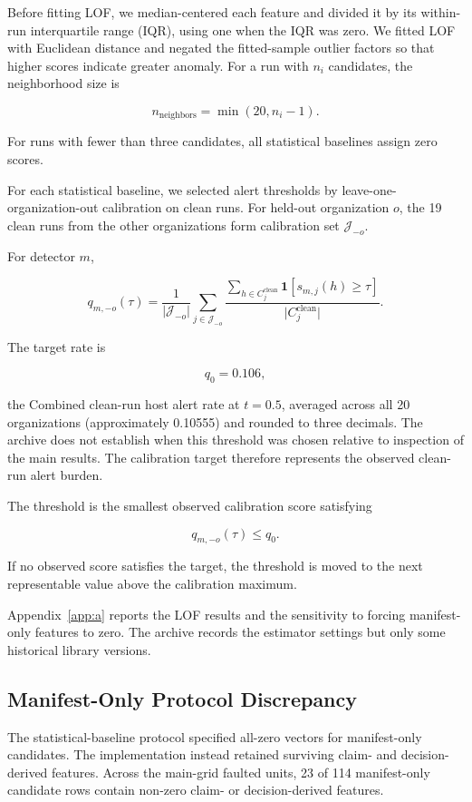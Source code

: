 \documentclass[sn-basic]{sn-jnl}%
\theoremstyle{thmstyleone}%
\theoremstyle{thmstyletwo}%
\theoremstyle{thmstylethree}%
\begin{document}
Before fitting LOF, we median-centered each feature and divided it by its within-run interquartile range (IQR), using one when the IQR was zero. We fitted LOF with Euclidean distance and negated the fitted-sample outlier factors so that higher scores indicate greater anomaly. For a run with \(n_i\) candidates, the neighborhood size is

\[
n_{\mathrm{neighbors}}=\min(20,n_i-1).
\]

For runs with fewer than three candidates, all statistical baselines assign zero scores.

For each statistical baseline, we selected alert thresholds by leave-one-organization-out calibration on clean runs. For held-out organization \(o\), the 19 clean runs from the other organizations form calibration set \(\mathcal{J}_{-o}\).

For detector \(m\),

\[
q_{m,-o}(\tau)=\frac{1}{\lvert\mathcal J_{-o}\rvert}\sum_{j\in\mathcal J_{-o}}\frac{\displaystyle\sum_{h\in C_j^{\mathrm{clean}}}\mathbf{1}\!\left[s_{m,j}(h)\ge\tau\right]}{\lvert C_j^{\mathrm{clean}}\rvert}.
\]

The target rate is

\[
q_0=0.106,
\]

the Combined clean-run host alert rate at \(t=0.5\), averaged across all 20 organizations (approximately 0.10555) and rounded to three decimals. The archive does not establish when this threshold was chosen relative to inspection of the main results. The calibration target therefore represents the observed clean-run alert burden.

The threshold is the smallest observed calibration score satisfying

\[
q_{m,-o}(\tau)\le q_0.
\]

If no observed score satisfies the target, the threshold is moved to the next representable value above the calibration maximum.

Appendix~\ref{app:a} reports the LOF results and the sensitivity to forcing manifest-only features to zero. The archive records the estimator settings but only some historical library versions.

\subsection{Manifest-Only Protocol Discrepancy}\label{sec:manifest-only}

The statistical-baseline protocol specified all-zero vectors for manifest-only candidates. The implementation instead retained surviving claim- and decision-derived features. Across the main-grid faulted units, 23 of 114 manifest-only candidate rows contain non-zero claim- or decision-derived features.
\end{document}
